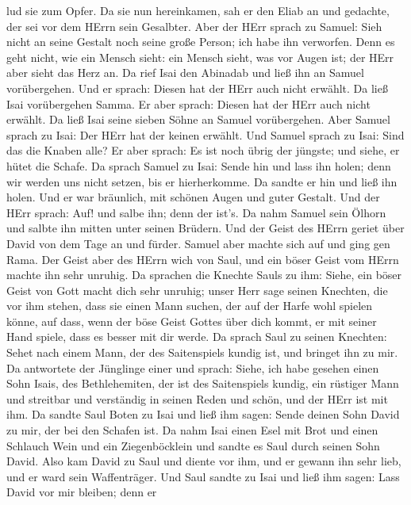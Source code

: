 lud sie zum Opfer.  Da sie nun hereinkamen, sah er den Eliab
an und gedachte, der sei vor dem HErrn sein Gesalbter.  Aber
der HErr sprach zu Samuel: Sieh nicht an seine Gestalt noch seine große
Person; ich habe ihn verworfen. Denn es geht nicht, wie ein Mensch
sieht: ein Mensch sieht, was vor Augen ist; der HErr aber sieht das Herz
an.  Da rief Isai den Abinadab und ließ ihn an Samuel
vorübergehen. Und er sprach: Diesen hat der HErr auch nicht erwählt.
 Da ließ Isai vorübergehen Samma. Er aber sprach: Diesen hat
der HErr auch nicht erwählt.  Da ließ Isai seine sieben
Söhne an Samuel vorübergehen. Aber Samuel sprach zu Isai: Der HErr hat
der keinen erwählt.  Und Samuel sprach zu Isai: Sind das
die Knaben alle? Er aber sprach: Es ist noch übrig der jüngste; und
siehe, er hütet die Schafe. Da sprach Samuel zu Isai: Sende hin und lass
ihn holen; denn wir werden uns nicht setzen, bis er hierherkomme.
 Da sandte er hin und ließ ihn holen. Und er war bräunlich,
mit schönen Augen und guter Gestalt. Und der HErr sprach: Auf! und salbe
ihn; denn der ist's.  Da nahm Samuel sein Ölhorn und salbte
ihn mitten unter seinen Brüdern. Und der Geist des HErrn geriet über
David von dem Tage an und fürder. Samuel aber machte sich auf und ging
gen Rama.  Der Geist aber des HErrn wich von Saul, und ein
böser Geist vom HErrn machte ihn sehr unruhig.  Da sprachen
die Knechte Sauls zu ihm: Siehe, ein böser Geist von Gott macht dich
sehr unruhig;  unser Herr sage seinen Knechten, die vor ihm
stehen, dass sie einen Mann suchen, der auf der Harfe wohl spielen
könne, auf dass, wenn der böse Geist Gottes über dich kommt, er mit
seiner Hand spiele, dass es besser mit dir werde.  Da
sprach Saul zu seinen Knechten: Sehet nach einem Mann, der des
Saitenspiels kundig ist, und bringet ihn zu mir.  Da
antwortete der Jünglinge einer und sprach: Siehe, ich habe gesehen einen
Sohn Isais, des Bethlehemiten, der ist des Saitenspiels kundig, ein
rüstiger Mann und streitbar und verständig in seinen Reden und schön,
und der HErr ist mit ihm.  Da sandte Saul Boten zu Isai und
ließ ihm sagen: Sende deinen Sohn David zu mir, der bei den Schafen ist.
 Da nahm Isai einen Esel mit Brot und einen Schlauch Wein
und ein Ziegenböcklein und sandte es Saul durch seinen Sohn David.
 Also kam David zu Saul und diente vor ihm, und er gewann
ihn sehr lieb, und er ward sein Waffenträger.  Und Saul
sandte zu Isai und ließ ihm sagen: Lass David vor mir bleiben; denn er
